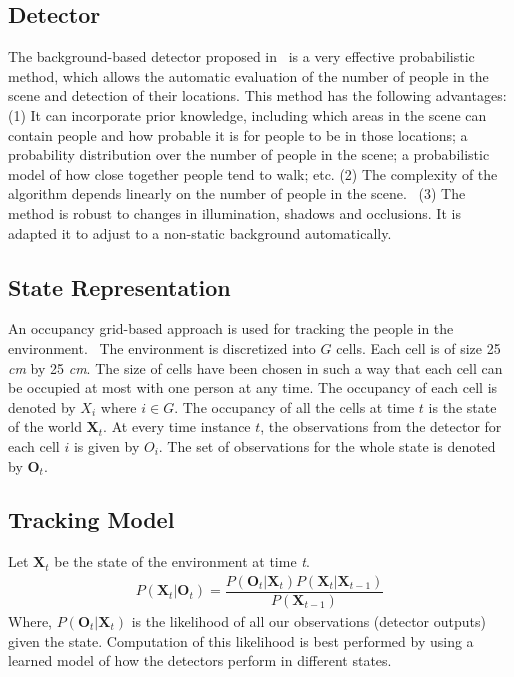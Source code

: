 \subsection{Detector}
The background-based detector proposed in~\cite{englebienne-bnaic} is a very effective probabilistic method, which allows the automatic evaluation of the number of people in the scene and detection of their locations. This method has the following advantages: (1) It can incorporate prior knowledge, including which areas in the scene can contain people and how probable it is for people to be in those locations; a probability distribution over the number of people in the scene; a probabilistic model of how close
together people tend to walk; etc. (2) The complexity of the algorithm depends linearly on the number of people in the scene.%
~(3) The method is robust to changes in illumination, shadows and occlusions. It is adapted it to adjust to a non-static background automatically.

\subsection{State Representation}

An occupancy grid-based approach is used for tracking the people in the environment.%
~The environment is discretized into $G$ cells. Each cell is of size 25 \textit{cm} by 25 \textit{cm}. The size of cells have been chosen in such a way that each cell can be occupied at most with one person at any time. The occupancy of each cell is denoted by $X_{i}$ where $i \in G$. The occupancy of all the cells at time $t$ is the state of the world $\textbf{X}_{t}$. At every time instance $t$, the observations from the detector for each cell $i$ is given by $O_{i}$. The set of observations for the whole state is denoted by $\textbf{O}_{t}$. 

\subsection{Tracking Model}

Let $\textbf{X}_{t}$ be the state of the environment at time \textit{t}.
\begin{align}
P(\textbf{X}_{t} | \textbf{O}_{t}) = \dfrac{P(\textbf{O}_{t} | \textbf{X}_{t}) P(\textbf{X}_{t}|\textbf{X}_{t-1})} {P(\textbf{X}_{t-1})}
\end{align} 
Where, $P(\textbf{O}_{t} | \textbf{X}_{t})$ is the likelihood of all our observations (detector outputs) given the state. Computation of this likelihood is best performed by using a learned model of how the detectors perform in different states.

